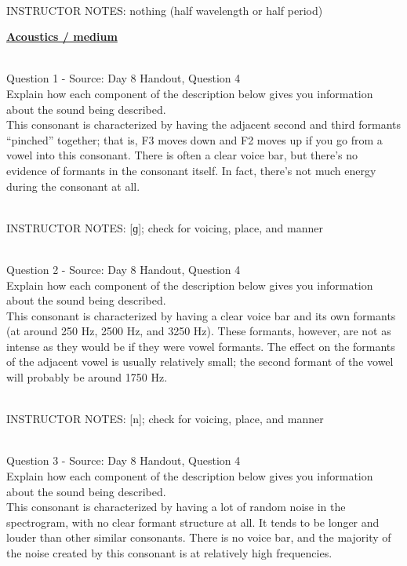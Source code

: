 \documentclass[12pt]{article}
\begin{document}
~\\
INSTRUCTOR NOTES: nothing (half wavelength or half period)


\newpage\textbf{\underline{\huge Acoustics / medium\\}}

~\\

{\large Question 1} - Source: Day 8 Handout, Question 4\\

Explain how each component of the description below gives you information about the sound being described.\\

This consonant is characterized by having the adjacent second and third formants ``pinched'' together; that is, F3 moves down and F2 moves up if you go from a vowel into this consonant. There is often a clear voice bar, but there’s no evidence of formants in the consonant itself. In fact, there’s not much energy during the consonant at all.


~\\
INSTRUCTOR NOTES: [ɡ]; check for voicing, place, and manner


~\\

{\large Question 2} - Source: Day 8 Handout, Question 4\\

Explain how each component of the description below gives you information about the sound being described.\\

This consonant is characterized by having a clear voice bar and its own formants (at around 250 Hz, 2500 Hz, and 3250 Hz). These formants, however, are not as intense as they would be if they were vowel formants. The effect on the formants of the adjacent vowel is usually relatively small; the second formant of the vowel will probably be around 1750 Hz.


~\\
INSTRUCTOR NOTES: [n]; check for voicing, place, and manner


~\\

{\large Question 3} - Source: Day 8 Handout, Question 4\\

Explain how each component of the description below gives you information about the sound being described.\\

This consonant is characterized by having a lot of random noise in the spectrogram, with no clear formant structure at all. It tends to be longer and louder than other similar consonants. There is no voice bar, and the majority of the noise created by this consonant is at relatively high frequencies.
\end{document}
